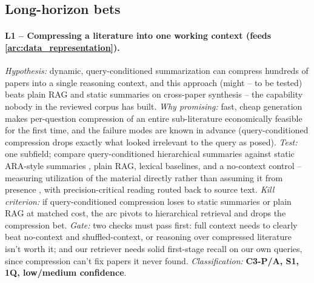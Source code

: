 \subsection{Long-horizon bets}
\label{section:long_term_bets}

\paragraph{L1 -- Compressing a literature into one working context (feeds \ref{arc:data_representation}).}
\textit{Hypothesis:} dynamic, query-conditioned summarization can compress hundreds of papers into a single reasoning context, and this approach (might -- to be tested) beats plain RAG and static summaries on cross-paper synthesis -- the capability nobody in the reviewed corpus has built.
\textit{Why promising:} fast, cheap generation makes per-question compression of an entire sub-literature economically feasible for the first time, and the failure modes are known in advance (query-conditioned compression drops exactly what looked irrelevant to the query as posed).
\textit{Test:} one subfield; compare query-conditioned hierarchical summaries against static ARA-style summaries \cite{2604.24658}, plain RAG, lexical baselines, and a no-context control -- measuring utilization of the material directly rather than assuming it from presence \cite{2605.26302}, with precision-critical reading routed back to source text.
\textit{Kill criterion:} if query-conditioned compression loses to static summaries or plain RAG at matched cost, the arc pivots to hierarchical retrieval and drops the compression bet.
\textit{Gate:} two checks must pass first: full context needs to clearly beat no-context and shuffled-context, or reasoning over compressed literature isn't worth it; and our retriever needs solid first-stage recall on our own queries, since compression can't fix papers it never found.
\textit{Classification:} \textbf{C3-P/A, S1, 1Q, low/medium confidence}.


